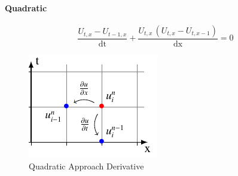 \documentclass[12pt]{article}
\author{Michael Schmid}
\begin{document}
	\paragraph{Quadratic}

    	\begin{equation}
    	       \frac{U_{t,x}-U_{t-1,x}}{\mathrm{dt}}+\frac{U_{t,x}\,\left(U_{t,x}-U_{t,x-1}\right)}{\mathrm{dx}}=0
    	\end{equation}

        \begin{figure}[!ht]
          \centering
          \includegraphics[width=.8\textwidth]{../tikz/quadratic/quadratic.pdf}
          \caption{Quadratic Approach Derivative}
          \label{fig:STDL}
       \end{figure}



      \begin{frame}
        \centering
      \end{frame}
\end{document}
